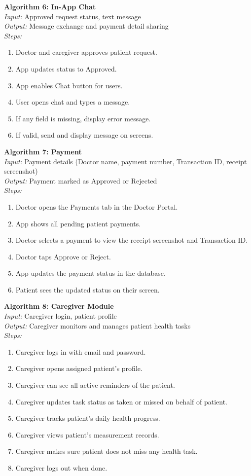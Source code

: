 \textbf{Algorithm 6: In-App Chat}\\
\textit{Input:} Approved request status, text message\\
\textit{Output:} Message exchange and payment detail sharing\\
\textit{Steps:}
\begin{enumerate}
    \item Doctor and caregiver approves patient request.
    \item App updates status to Approved.
    \item App enables Chat button for users.
    \item User opens chat and types a message.
    \item If any field is missing, display error message.
    \item If valid, send and display message on screens.
\end{enumerate}

\textbf{Algorithm 7: Payment}\\
\textit{Input:} Payment details (Doctor name, payment number, Transaction ID, receipt screenshot)\\
\textit{Output:} Payment marked as Approved or Rejected\\
\textit{Steps:}
\begin{enumerate}
    \item Doctor opens the Payments tab in the Doctor Portal.
    \item App shows all pending patient payments.
    \item Doctor selects a payment to view the receipt screenshot and Transaction ID.
    \item Doctor taps Approve or Reject.
    \item App updates the payment status in the database.
    \item Patient sees the updated status on their screen.
\end{enumerate}

\textbf{Algorithm 8: Caregiver Module}\\
\textit{Input:} Caregiver login, patient profile\\
\textit{Output:} Caregiver monitors and manages patient health tasks\\
\textit{Steps:}
\begin{enumerate}
    \item Caregiver logs in with email and password.
    \item Caregiver opens assigned patient's profile.
    \item Caregiver can see all active reminders of the patient.
    \item Caregiver updates task status as taken or missed on behalf of patient.
    \item Caregiver tracks patient's daily health progress.
    \item Caregiver views patient's measurement records.
    \item Caregiver makes sure patient does not miss any health task.
    \item Caregiver logs out when done.
\end{enumerate}

